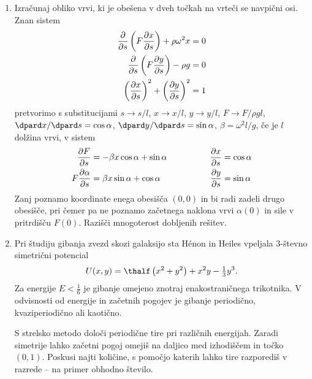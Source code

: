 \begin{enumerate}
\item Izračunaj obliko vrvi, ki je obešena v dveh točkah na vrteči se
  navpični osi. Znan sistem
\begin{align*}
\frac{\partial }{\partial s}\left(F\frac{\partial x}{\partial s}\right)+\rho\omega^2x&=0\\
\frac{\partial }{\partial s}\left(F\frac{\partial y}{\partial s}\right)-\rho g&=0\\
\left(\frac{\partial x}{\partial s}\right)^2+\left(\frac{\partial y}{\partial s}\right)^2&=1
\end{align*}
%
pretvorimo s substitucijami $s\to s/l$, $x\to x/l$, $y\to y/l$, $F\to
F/\rho g l$, $\dpard x/\dpard s=\cos\alpha$, $\dpard y/\dpard s=\sin\alpha$, $\beta=\omega^2
l/g$, če je $l$ dolžina vrvi, v sistem
%
\begin{alignat*}{2}
\frac{\partial F}{\partial s}&=-\beta x\cos\alpha+\sin\alpha&\qquad\qquad
\frac{\partial x}{\partial s}&=\cos\alpha\\
F\frac{\partial \alpha}{\partial s}&=\beta x\sin\alpha+\cos\alpha&\qquad\qquad
\frac{\partial y}{\partial s}&=\sin\alpha
\end{alignat*}
%
Zanj poznamo koordinate enega obesišča $(0,0)$ in bi radi zadeli drugo
obesišče, pri čemer pa ne poznamo začetnega naklona vrvi $\alpha(0)$
in sile v pritrdišču $F(0)$. Razišči mnogoterost dobljenih rešitev.

\item Pri študiju gibanja zvezd skozi galaksijo sta H\'enon in Heiles
  vpeljala 3-števno simetrični potencial
  \begin{equation*}
    U(x,y)=\thalf\left(x^2+y^2\right)+x^2y-\tfrac13 y^3.
  \end{equation*}
  Za energije $E<\frac16$ je gibanje omejeno znotraj enakostraničnega trikotnika.
  V odvisnosti od energije in začetnih pogojev je gibanje periodično, kvaziperiodično ali kaotično.
  
  S strelsko metodo določi periodične tire pri različnih energijah.
  Zaradi simetrije lahko začetni pogoj omejiš na daljico med izhodiščem in točko $(0,1)$.
  Poskusi najti količine, s pomočjo katerih lahko tire razporediš v razrede -- na primer obhodno število.
\end{enumerate}